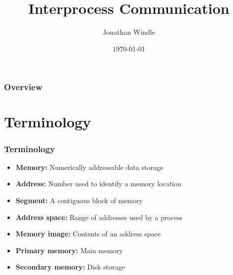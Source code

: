 \documentclass{beamer}
\title[Interprocess Communication]{Interprocess Communication} %
\author{Jonathan Windle} %
\institute[UEA] %
{
University of East Anglia \\ %
\medskip
\textit{J.Windle@uea.ac.uk} %
}
\date{\today} %
\begin{document}
\begin{frame}
\titlepage %
\end{frame}

\begin{frame}[allowframebreaks]
\frametitle{Overview} %
\tableofcontents %
\end{frame}

\section{Terminology}
\begin{frame}
\frametitle{Terminology}
\begin{itemize}
\item \textbf{Memory:} Numerically addressable data storage
\item \textbf{Address:} Number used to identify a memory location
\item \textbf{Segment:} A contiguous block of memory
\item \textbf{Address space:} Range of addresses used by a process
\item \textbf{Memory image:} Contents of an address space
\item \textbf{Primary memory:} Main memory
\item \textbf{Secondary memory:} Disk storage
\end{itemize}
\end{frame}
\end{document}
